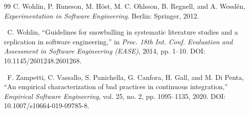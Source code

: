 \begin{thebibliography}{99}
 C. Wohlin, P. Runeson, M. Höst, M. C. Ohlsson, B. Regnell, and A. Wesslén, \textit{Experimentation in Software Engineering}. Berlin: Springer, 2012.

\dag\ C. Wohlin, ``Guidelines for snowballing in systematic literature studies and a replication in software engineering,'' in \textit{Proc. 18th Int. Conf. Evaluation and Assessment in Software Engineering (EASE)}, 2014, pp. 1--10. DOI: 10.1145/2601248.2601268.

\dag\ F. Zampetti, C. Vassallo, S. Panichella, G. Canfora, H. Gall, and M. Di Penta, ``An empirical characterization of bad practices in continuous integration,'' \textit{Empirical Software Engineering}, vol. 25, no. 2, pp. 1095--1135, 2020. DOI: 10.1007/s10664-019-09785-8.

\end{thebibliography}
